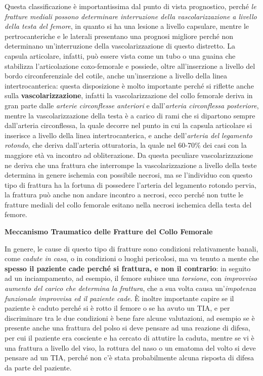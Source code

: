 \documentclass[]{article}
\begin{document}
Questa classificazione è importantissima dal punto di vista prognostico,
perché \emph{le fratture mediali possono determinare interruzione della
vascolarizzazione a livello della testa del femore}, in quanto si ha una
lesione a livello capsulare, mentre le pertrocanteriche e le laterali
presentano una prognosi migliore perché non determinano un'interruzione
della vascolarizzazione di questo distretto. La capsula articolare,
infatti, può essere vista come un tubo o una guaina che stabilizza
l'articolazione coxo-femorale e possiede, oltre all'inserzione a livello
del bordo circonferenziale del cotile, anche un'inserzione a livello
della linea intertrocanterica: questa disposizione è molto importante
perché si riflette anche sulla \textbf{vascolarizzazione}, infatti la
vascolarizzazione del collo femorale deriva in gran parte dalle
\emph{arterie circonflesse anteriori} e dall'\emph{arteria circonflessa
posteriore}, mentre la vascolarizzazione della testa è a carico di rami
che si dipartono sempre dall'arteria circonflessa, la quale decorre nel
punto in cui la capsula articolare si inserisce a livello della linea
intertrocanterica, e anche dell'\emph{arteria del legamento rotondo},
che deriva dall'arteria otturatoria, la quale nel 60-70\% dei casi con
la maggiore età va incontro ad obliterazione. Da questa peculiare
vascolarizzazione ne deriva che una frattura che interrompe la
vascolarizzazione a livello della teste determina in genere ischemia con
possibile necrosi, ma se l'individuo con questo tipo di frattura ha la
fortuna di possedere l'arteria del legamento rotondo pervia, la frattura
può anche non andare incontro a necrosi, ecco perché non tutte le
fratture mediali del collo femorale esitano nella necrosi ischemica
della testa del femore.

\textbf{Meccanismo Traumatico delle Fratture del Collo Femorale}

In genere, le cause di questo tipo di fratture sono condizioni
relativamente banali, come \emph{cadute in casa}, o in condizioni o
luoghi pericolosi, ma va tenuto a mente che \textbf{spesso il paziente
cade perché si frattura, e non il contrario}: in seguito ad un
inciampamento, ad esempio, il femore subisce una \emph{torsione}, con
\emph{improvviso aumento del carico che determina la frattura}, che a
sua volta causa un'\emph{impotenza funzionale improvvisa ed il paziente
cade}. È inoltre importante capire se il paziente è caduto perché si è
rotto il femore o se ha avuto un TIA, e per discriminare tra le due
condizioni è bene fare alcune valutazioni, ad esempio se è presente
anche una frattura del polso si deve pensare ad una reazione di difesa,
per cui il paziente era cosciente e ha cercato di attutire la caduta,
mentre se vi è una frattura a livello del viso, la rottura del naso o un
ematoma del volto si deve pensare ad un TIA, perché non c'è stata
probabilmente alcuna risposta di difesa da parte del paziente.
\end{document}
